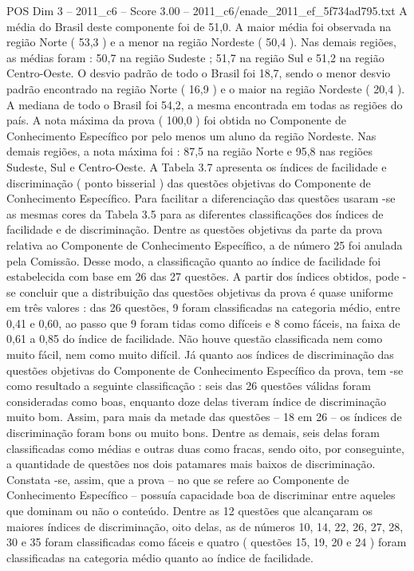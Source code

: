 \begin{textsample}{POS Dim 3 – 2011\_c6 – Score 3.00 – 2011\_c6/enade\_2011\_ef\_5f734ad795.txt}
A média do Brasil deste componente foi de 51,0.
A maior média foi observada na região Norte ( 53,3 ) e a menor na região Nordeste ( 50,4 ).
Nas demais regiões, as médias foram : 50,7 na região Sudeste ; 51,7 na região Sul e 51,2 na região Centro-Oeste.
O desvio padrão de todo o Brasil foi 18,7, sendo o menor desvio padrão encontrado na região Norte ( 16,9 ) e o maior na região Nordeste ( 20,4 ).
A mediana de todo o Brasil foi 54,2, a mesma encontrada em todas as regiões do país.
A nota máxima da prova ( 100,0 ) foi obtida no Componente de Conhecimento Específico por pelo menos um aluno da região Nordeste.
Nas demais regiões, a nota máxima foi : 87,5 na região Norte e 95,8 nas regiões Sudeste, Sul e Centro-Oeste.
A Tabela 3.7 apresenta os índices de facilidade e discriminação ( ponto bisserial ) das questões objetivas do Componente de Conhecimento Específico.
Para facilitar a diferenciação das questões usaram -se as mesmas cores da Tabela 3.5 para as diferentes classificações dos índices de facilidade e de discriminação.
Dentre as questões objetivas da parte da prova relativa ao Componente de Conhecimento Específico, a de número 25 foi anulada pela Comissão.
Desse modo, a classificação quanto ao índice de facilidade foi estabelecida com base em 26 das 27 questões.
A partir dos índices obtidos, pode -se concluir que a distribuição das questões objetivas da prova é quase uniforme em três valores : das 26 questões, 9 foram classificadas na categoria médio, entre 0,41 e 0,60, ao passo que 9 foram tidas como difíceis e 8 como fáceis, na faixa de 0,61 a 0,85 do índice de facilidade.
Não houve questão classificada nem como muito fácil, nem como muito difícil.
Já quanto aos índices de discriminação das questões objetivas do Componente de Conhecimento Específico da prova, tem -se como resultado a seguinte classificação : seis das 26 questões válidas foram consideradas como boas, enquanto doze delas tiveram índice de discriminação muito bom.
Assim, para mais da metade das questões – 18 em 26 – os índices de discriminação foram bons ou muito bons.
Dentre as demais, seis delas foram classificadas como médias e outras duas como fracas, sendo oito, por conseguinte, a quantidade de questões nos dois patamares mais baixos de discriminação.
Constata -se, assim, que a prova – no que se refere ao Componente de Conhecimento Específico – possuía capacidade boa de discriminar entre aqueles que dominam ou não o conteúdo.
Dentre as 12 questões que alcançaram os maiores índices de discriminação, oito delas, as de números 10, 14, 22, 26, 27, 28, 30 e 35 foram classificadas como fáceis e quatro ( questões 15, 19, 20 e 24 ) foram classificadas na categoria médio quanto ao índice de facilidade.

\end{textsample}
